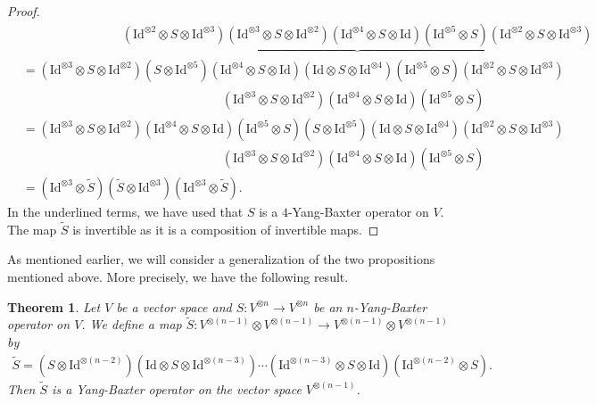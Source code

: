 \documentclass[a4paper,reqno,10pt]{amsart}
\theoremstyle{plain}
\newtheorem{thm}{Theorem}[section]
\theoremstyle{definition}
\theoremstyle{remark}
\begin{document}
\begin{proof}
\begin{align*}
& \qquad \qquad \qquad \qquad \underbrace{ (\mathrm{Id}^{\otimes 2} \otimes S \otimes \mathrm{Id}^{\otimes 3}) (\mathrm{Id}^{\otimes 3} \otimes S \otimes \mathrm{Id}^{\otimes 2})  (\mathrm{Id}^{\otimes 4} \otimes S \otimes \mathrm{Id}) (\mathrm{Id}^{\otimes 5} \otimes S) (\mathrm{Id}^{\otimes 2} \otimes S \otimes \mathrm{Id}^{\otimes 3})} \\
&= (\mathrm{Id}^{\otimes 3} \otimes S \otimes \mathrm{Id}^{\otimes 2}) ( S \otimes \mathrm{Id}^{\otimes 5}) (\mathrm{Id}^{\otimes 4} \otimes S \otimes \mathrm{Id}) (\mathrm{Id} \otimes S \otimes \mathrm{Id}^{\otimes 4}) (\mathrm{Id}^{\otimes 5} \otimes S) (\mathrm{Id}^{\otimes 2} \otimes S \otimes \mathrm{Id}^{\otimes 3}) \\
& \qquad \qquad \qquad \qquad \qquad \qquad \qquad \qquad (\mathrm{Id}^{\otimes 3} \otimes S \otimes \mathrm{Id}^{\otimes 2}) (\mathrm{Id}^{\otimes 4} \otimes S \otimes \mathrm{Id}) (\mathrm{Id}^{\otimes 5} \otimes S) \\
&= (\mathrm{Id}^{\otimes 3} \otimes S \otimes \mathrm{Id}^{\otimes 2})  (\mathrm{Id}^{\otimes 4} \otimes S \otimes \mathrm{Id})  (\mathrm{Id}^{\otimes 5} \otimes S)  ( S \otimes \mathrm{Id}^{\otimes 5})  (\mathrm{Id} \otimes S \otimes \mathrm{Id}^{\otimes 4}) (\mathrm{Id}^{\otimes 2} \otimes S \otimes \mathrm{Id}^{\otimes 3}) \\ & \qquad \qquad \qquad \qquad \qquad \qquad \qquad \qquad 
  (\mathrm{Id}^{\otimes 3} \otimes S \otimes \mathrm{Id}^{\otimes 2}) (\mathrm{Id}^{\otimes 4} \otimes S \otimes \mathrm{Id})  (\mathrm{Id}^{\otimes 5} \otimes S) \\
  &= (\mathrm{Id}^{\otimes 3} \otimes \widetilde{S})   (\widetilde{S} \otimes \mathrm{Id}^{\otimes 3})  (\mathrm{Id}^{\otimes 3} \otimes \widetilde{S}).
    \end{align*}
    In the underlined terms, we have used that $S$ is a $4$-Yang-Baxter operator on $V$. The map $\widetilde{S}$ is invertible as it is a composition of invertible maps.
\end{proof}

As mentioned earlier, we will consider a generalization of the two propositions mentioned above. More precisely, we have the following result.

\begin{thm}\label{theorem-19}
    Let $V$ be a vector space and $S : V^{\otimes n} \rightarrow V^{\otimes n}$ be an $n$-Yang-Baxter operator on $V$. We define a map $\widetilde{S} : V^{\otimes (n-1)} \otimes V^{\otimes (n-1)}  \rightarrow V^{\otimes (n-1)}  \otimes V^{\otimes (n-1)} $ by 
    \begin{align*}
        \widetilde{S} =   (S \otimes \mathrm{Id}^{\otimes (n-2)}) (\mathrm{Id} \otimes S \otimes \mathrm{Id}^{\otimes (n-3)}) \cdots (\mathrm{Id}^{\otimes (n-3)} \otimes S \otimes \mathrm{Id}) (\mathrm{Id}^{\otimes (n-2)} \otimes S).
    \end{align*}
    Then $\widetilde{S} $ is a Yang-Baxter operator on the vector space $V^{\otimes (n-1)}$.
\end{thm}
\end{document}
